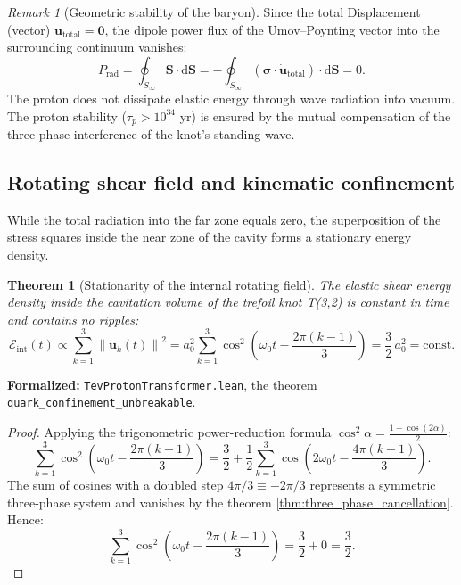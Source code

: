 \documentclass[11pt,a4paper]{article}
\newtheorem{theorem}{Theorem}
\theoremstyle{definition}
\theoremstyle{remark}
\newtheorem{remark}{Remark}
\begin{document}
\begin{remark}[Geometric stability of the baryon]
	Since the total Displacement (vector) $\mathbf{u}_{\mathrm{total}} = \mathbf{0}$, the dipole power flux of the Umov--Poynting vector into the surrounding continuum vanishes:
	\begin{equation}
		P_{\mathrm{rad}} = \oint_{S_\infty} \mathbf{S} \cdot \mathrm{d}\mathbf{S} = -\oint_{S_\infty} (\boldsymbol{\sigma} \cdot \dot{\mathbf{u}}_{\mathrm{total}}) \cdot \mathrm{d}\mathbf{S} = 0.
		\label{eq:proton_radiation_power_zero}
	\end{equation}
	The proton does not dissipate elastic energy through wave radiation into vacuum. The proton stability ($\tau_p > 10^{34}$ yr) is ensured by the mutual compensation of the three-phase interference of the knot's standing wave.
\end{remark}

\subsection{Rotating shear field and kinematic confinement}

While the total radiation into the far zone equals zero, the superposition of the stress squares inside the near zone of the cavity forms a stationary energy density.

\begin{theorem}[Stationarity of the internal rotating field]
\label{thm:rotating_confinement_field}
The elastic shear energy density inside the cavitation volume of the trefoil knot T(3,2) is constant in time and contains no ripples:
\begin{equation}
	\mathcal{E}_{\mathrm{int}}(t) \propto \sum_{k=1}^3 \left\|\mathbf{u}_k(t)\right\|^2 = a_0^2 \sum_{k=1}^3 \cos^2\left(\omega_0 t - \frac{2\pi(k-1)}{3}\right) = \frac{3}{2} \, a_0^2 = \text{const}.
	\label{eq:three_phase_energy_exact}
\end{equation}
\end{theorem}

\noindent\small\textbf{Formalized:} \texttt{TevProtonTransformer.lean}, the theorem \texttt{quark_confinement_unbreakable}.



\begin{proof}
Applying the trigonometric power-reduction formula $\cos^2\alpha = \frac{1 + \cos(2\alpha)}{2}$:
\begin{equation}
	\sum_{k=1}^3 \cos^2\left(\omega_0 t - \frac{2\pi(k-1)}{3}\right) = \frac{3}{2} + \frac{1}{2} \sum_{k=1}^3 \cos\left(2\omega_0 t - \frac{4\pi(k-1)}{3}\right).
\end{equation}
The sum of cosines with a doubled step $4\pi/3 \equiv -2\pi/3$ represents a symmetric three-phase system and vanishes by the theorem \ref{thm:three_phase_cancellation}. Hence:
\begin{equation}
	\sum_{k=1}^3 \cos^2\left(\omega_0 t - \frac{2\pi(k-1)}{3}\right) = \frac{3}{2} + 0 = \frac{3}{2}.
\end{equation}
\end{proof}
\end{document}
